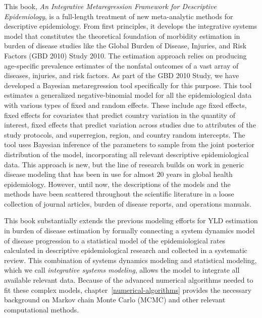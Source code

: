 This book, \emph{An Integrative Metaregression Framework for Descriptive
  Epidemiology}, is a full-length treatment of new meta-analytic
methods for descriptive epidemiology.  From first principles, it
develops the integrative systems model that constitutes the
theoretical foundation of morbidity estimation
in burden of disease studies like the Global Burden of Disease, Injuries, and Risk Factors 
 (GBD 2010) Study 2010.  The estimation approach relies on producing
age-specific prevalence estimates of the nonfatal outcomes of a vast
array of diseases, injuries, and risk factors.  As part of the GBD
2010 Study, we have developed a Bayesian metaregression tool
specifically for this purpose. This tool estimates a generalized
negative-binomial model for all the epidemiological data with various
types of fixed and random effects.  These include age fixed effects,
fixed effects for covariates that predict country variation in the
quantity of interest, fixed effects that predict variation across
studies due to attributes of the study protocols, and superregion,
region, and country random intercepts.  The tool uses Bayesian
inference of the parameters to sample from the joint posterior
distribution of the model, incorporating all relevant descriptive
epidemiological data.  This approach is new, but the line of research
builds on work in generic disease modeling that has been in use for
almost $20$ years in global health
epidemiology.\cite{barendregt_generic_2003} However, until now, the
descriptions of the models and the methods have been scattered throughout
the scientific literature in a loose collection of journal articles,
burden of disease reports, and operations manuals.

This book substantially extends the previous modeling efforts for YLD
estimation in burden of disease estimation by formally connecting a
system dynamics model of disease progression to a statistical model of
the epidemiological rates calculated in descriptive
epidemiological research and collected in a systematic
review.  This combination of systems dynamics modeling and statistical
modeling, which we call
\emph{integrative systems modeling}, allows the model to integrate all
available relevant data.  Because of the advanced numerical algorithms needed to fit these complex models, chapter~\ref{numerical-algorithms} provides the
necessary background on Markov chain Monte Carlo (MCMC) and other
relevant computational methods.

